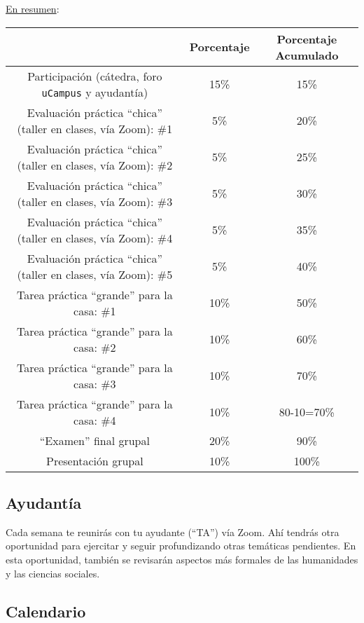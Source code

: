 \documentclass[letterpaper]{article}
\begin{document}
\underline{En resumen}:

\begin{table}[h]
\begin{tabular}{ccc}
							& \textbf{Porcentaje} & {\bf Porcentaje Acumulado} \\
							\hline
Participaci\'on (c\'atedra, foro \texttt{uCampus} y ayudant\'ia) & 15\%       & 15\%                 \\
\hline
Evaluaci\'on pr\'actica ``chica'' (taller en clases, v\'ia Zoom): \#1 & 5\% & 20\%                 \\
Evaluaci\'on pr\'actica ``chica'' (taller en clases, v\'ia Zoom): \#2 & 5\% & 25\%                 \\
Evaluaci\'on pr\'actica ``chica'' (taller en clases, v\'ia Zoom): \#3 & 5\% & 30\%                 \\
Evaluaci\'on pr\'actica ``chica'' (taller en clases, v\'ia Zoom): \#4 & 5\% & 35\%                 \\
Evaluaci\'on pr\'actica ``chica'' (taller en clases, v\'ia Zoom): \#5 & 5\% & 40\%  \\
\hline
Tarea pr\'actica ``grande'' para la casa: \#1 	 & 10\% & 50\%    \\
Tarea pr\'actica ``grande'' para la casa: \#2 	 & 10\% & 60\%    \\
Tarea pr\'actica ``grande'' para la casa: \#3 	 & 10\% & 70\%    \\
Tarea pr\'actica ``grande'' para la casa: \#4   & 10\% & 80-10=70\%    \\
\hline
``Examen'' final grupal & 20\% & 90\% \\
Presentaci\'on grupal & 10\% & 100\% \\
\hline             
\end{tabular}
\end{table}

\subsection*{Ayudant\'ia}

Cada semana te reunir\'as con tu ayudante (``TA'') v\'ia Zoom. Ah\'i tendr\'as otra oportunidad para ejercitar y seguir profundizando otras tem\'aticas pendientes. En esta oportunidad, tambi\'en se revisar\'an aspectos m\'as formales de las humanidades y las ciencias sociales. 

\subsection*{Calendario}
\end{document}
